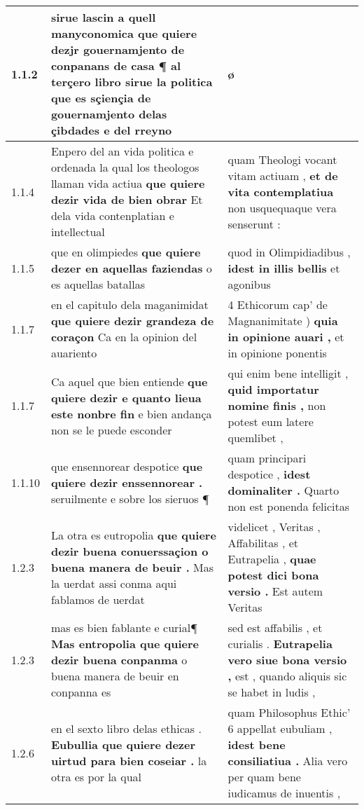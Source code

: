 \begin{tabular}{|p{1cm}|p{6.5cm}|p{6.5cm}|}

\hline
1.1.2 & sirue lascin a quell manyconomica \textbf{ que quiere dezjr gouernamjento de conpanans de casa ¶ al terçero libro sirue la politica } que es sçiençia de gouernamjento delas çibdades e del rreyno & ø \\\hline
1.1.4 & Enpero del an vida politica e ordenada la qual los theologos llaman vida actiua \textbf{ que quiere dezir vida de bien obrar } Et dela vida contenplatian e intellectual & quam Theologi vocant vitam actiuam , \textbf{ et de vita contemplatiua } non usquequaque vera senserunt : \\\hline
1.1.5 & que en olimpiedes \textbf{ que quiere dezer en aquellas faziendas } o es aquellas batallas & quod in Olimpidiadibus , \textbf{ idest in illis bellis } et agonibus \\\hline
1.1.7 & en el capitulo dela maganimidat \textbf{ que quiere dezir grandeza de coraçon } Ca en la opinion del auariento & 4 Ethicorum cap’ de Magnanimitate ) \textbf{ quia in opinione auari , } et in opinione ponentis \\\hline
1.1.7 & Ca aquel que bien entiende \textbf{ que quiere dezir e quanto lieua este nonbre fin } e bien andança non se le puede esconder & qui enim bene intelligit , \textbf{ quid importatur nomine finis , } non potest eum latere quemlibet , \\\hline
1.1.10 & que ensennorear despotice \textbf{ que quiere dezir enssennorear . } seruilmente e sobre los sieruos ¶ & quam principari despotice , \textbf{ idest dominaliter . } Quarto non est ponenda felicitas \\\hline
1.2.3 & La otra es eutropolia \textbf{ que quiere dezir buena conuerssaçion o buena manera de beuir . } Mas la uerdat assi conma aqui fablamos de uerdat & videlicet , Veritas , Affabilitas , et Eutrapelia , \textbf{ quae potest dici bona versio . } Est autem Veritas \\\hline
1.2.3 & mas es bien fablante e curial¶ \textbf{ Mas entropolia que quiere dezir buena conpanma } o buena manera de beuir en conpanna es & sed est affabilis , et curialis . \textbf{ Eutrapelia vero siue bona versio , } est , quando aliquis sic se habet in ludis , \\\hline
1.2.6 & en el sexto libro delas ethicas . \textbf{ Eubullia que quiere dezer uirtud para bien coseiar . } la otra es por la qual & quam Philosophus Ethic’ 6 appellat eubuliam , \textbf{ idest bene consiliatiua . } Alia vero per quam bene iudicamus de inuentis , \\\hline

\end{tabular}
